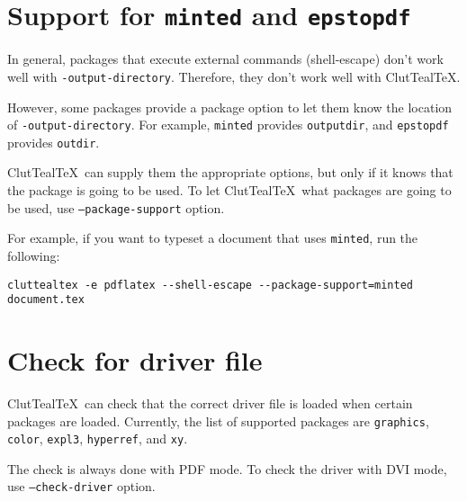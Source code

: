 \documentclass[a4paper]{report}
\newcommand\CluttealTeX{ClutTeal\TeX\xspace}
\newcommand\texpkg[1]{\texttt{#1}}
\begin{document}
\section{Support for \texpkg{minted} and \texpkg{epstopdf}}
In general, packages that execute external commands (shell-escape) don't work well with \texttt{-output-directory}.
Therefore, they don't work well with \CluttealTeX.

However, some packages provide a package option to let them know the location of \texttt{-output-directory}.
For example, \texpkg{minted} provides \texttt{outputdir}, and \texpkg{epstopdf} provides \texttt{outdir}.

\CluttealTeX\ can supply them the appropriate options, but only if it knows that the package is going to be used.
To let \CluttealTeX\ what packages are going to be used, use \texttt{--package-support} option.

For example, if you want to typeset a document that uses \texpkg{minted}, run the following:
\begin{verbatim}
cluttealtex -e pdflatex --shell-escape --package-support=minted document.tex
\end{verbatim}

\section{Check for driver file}

\CluttealTeX\ can check that the correct driver file is loaded when certain packages are loaded.
Currently, the list of supported packages are \texpkg{graphics}, \texpkg{color}, \texpkg{expl3}, \texpkg{hyperref}, and \texpkg{xy}.

The check is always done with PDF mode.
To check the driver with DVI mode, use \texttt{--check-driver} option.
\end{document}
